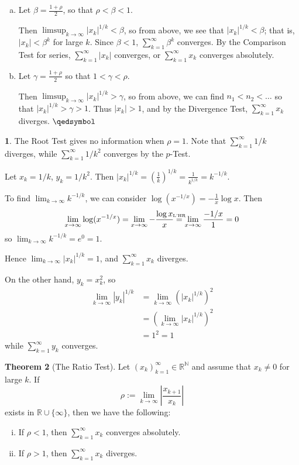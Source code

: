 \documentclass[11pt]{article}
\theoremstyle{definition}
\newtheorem{thm}{Theorem}[section]
\newtheorem{none}[thm]{}
\newcommand{\mbN}{\ensuremath{\mathbb{N}}}
\newcommand{\mbR}{\ensuremath{\mathbb{R}}}
\newcommand{\lhr}{\stackrel{\mathclap{\mbox{\normalfont\tiny L'HR}}}{=}}
\begin{document}
\begin{enumerate}[(a)] \vspace{-0.2cm}

\item Let $\beta = \frac{1+\rho}2$, so that $\rho < \beta < 1$. 

Then $\limsup_{k\to\infty} |x_k|^{1/k} < \beta$, so from above, we see that $|x_k|^{1/k} < \beta$; that is, $|x_k| < \beta^k$ for large $k$. Since $\beta < 1$, $\sum_{k=1}^\infty \beta^k$ converges. By the Comparison Test for series, $\sum_{k=1}^\infty |x_k|$ converges, or $\sum_{k=1}^\infty x_k$ converges absolutely.

\item Let $\gamma = \frac{1+\rho}2$ so that $1 < \gamma < \rho$. 

Then $\limsup_{k\to\infty} |x_k|^{1/k} > \gamma$, so from above, we can find $n_1 < n_2 < \dots$ so that $|x_k|^{1/k} > \gamma > 1$. Thus $|x_k| > 1$, and by the Divergence Test, $\sum_{k=1}^\infty x_k$ diverges. $\qedsymbol$

\end{enumerate}

\begin{none}
The Root Test gives no information when $\rho = 1$. Note that $\sum_{k=1}^\infty 1/k$ diverges, while $\sum_{k=1}^\infty 1/k^2$ converges by the $p$-Test.

Let $x_k = 1/k$, $y_k = 1/k^2$. Then $|x_k|^{1/k} = \left(\frac1k\right)^{1/k} = \frac{1}{k^{1/k}} = k^{-1/k}$.

To find $\lim_{k\to\infty} k^{-1/k}$, we can consider $\log(x^{-1/x}) = -\frac1x\log x$. Then
$$\lim_{x\to\infty} \log(x^{-1/x}) = \lim_{x\to\infty} -\frac{\log x}x \lhr \lim_{x\to\infty} \frac{-1/x}1 = 0$$
so $\lim_{k\to\infty} k^{-1/k} = e^0 = 1$. 
	
Hence $\lim_{k\to\infty} |x_k|^{1/k} = 1$, and $\sum_{k=1}^\infty x_k$ diverges. 

On the other hand, $y_k = x_k^2$, so
\begin{align*}
\lim_{k\to\infty} |y_k|^{1/k} & = \lim_{k\to\infty} \left(|x_k|^{1/k}\right)^2 \\
& = \left(\lim_{k\to\infty} |x_k|^{1/k}\right)^2 \\
& = 1^2 = 1
\end{align*}
while $\sum_{k=1}^\infty y_k$ converges.
\end{none}

\begin{thm}[The Ratio Test]
Let $(x_k)_{k=1}^\infty \in \mbR^\mbN$ and assume that $x_k \ne 0$ for large $k$. If 
$$\rho := \lim_{k\to\infty} \left| \frac{x_{k+1}}{x_k} \right|$$
exists in $\mbR \cup \{\infty\}$, then we have the following:
\begin{enumerate}[(i)] \vspace{-0.2cm}
\item If $\rho < 1$, then $\sum_{k=1}^\infty x_k$ converges absolutely.
\item If $\rho > 1$, then $\sum_{k=1}^\infty x_k$ diverges.
\end{enumerate}
\end{thm}
\end{document}
